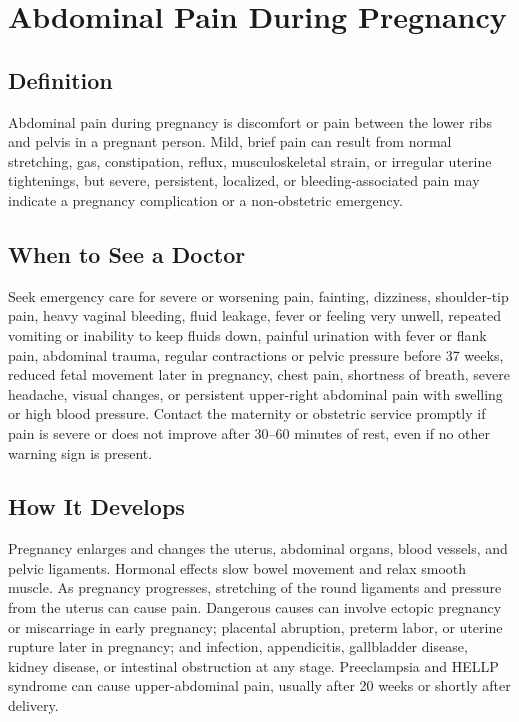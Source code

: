\chapter{Abdominal Pain During Pregnancy}

\section*{Definition}
Abdominal pain during pregnancy is discomfort or pain between the lower ribs and pelvis in a pregnant person. Mild, brief pain can result from normal stretching, gas, constipation, reflux, musculoskeletal strain, or irregular uterine tightenings, but severe, persistent, localized, or bleeding-associated pain may indicate a pregnancy complication or a non-obstetric emergency.

\section*{When to See a Doctor}
Seek emergency care for severe or worsening pain, fainting, dizziness, shoulder-tip pain, heavy vaginal bleeding, fluid leakage, fever or feeling very unwell, repeated vomiting or inability to keep fluids down, painful urination with fever or flank pain, abdominal trauma, regular contractions or pelvic pressure before 37 weeks, reduced fetal movement later in pregnancy, chest pain, shortness of breath, severe headache, visual changes, or persistent upper-right abdominal pain with swelling or high blood pressure. Contact the maternity or obstetric service promptly if pain is severe or does not improve after 30--60 minutes of rest, even if no other warning sign is present.

\section*{How It Develops}
Pregnancy enlarges and changes the uterus, abdominal organs, blood vessels, and pelvic ligaments. Hormonal effects slow bowel movement and relax smooth muscle. As pregnancy progresses, stretching of the round ligaments and pressure from the uterus can cause pain. Dangerous causes can involve ectopic pregnancy or miscarriage in early pregnancy; placental abruption, preterm labor, or uterine rupture later in pregnancy; and infection, appendicitis, gallbladder disease, kidney disease, or intestinal obstruction at any stage. Preeclampsia and HELLP syndrome can cause upper-abdominal pain, usually after 20 weeks or shortly after delivery.

